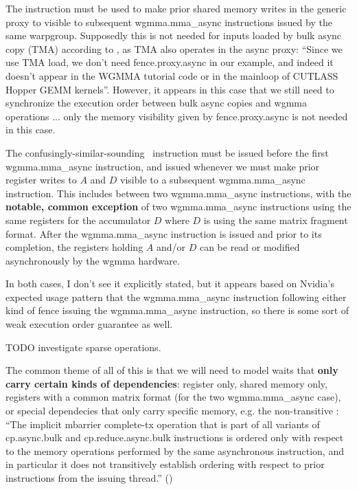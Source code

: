  The  instruction must be used to make prior shared memory writes in the generic proxy to visible to subsequent wgmma.mma\_async instructions issued by the same warpgroup.
Supposedly this is not needed for inputs loaded by bulk async copy (TMA) according to , as TMA also operates in the async proxy: ``Since we use TMA load, we don’t need fence.proxy.async in our example, and indeed it doesn’t appear in the WGMMA tutorial code or in the mainloop of CUTLASS Hopper GEMM kernels''.
However, it appears in this case that we still need to synchronize the execution order between bulk async copies and wgmma operations ... only the memory visibility given by fence.proxy.async is not needed in this case.

\filbreak
{} The confusingly-similar-sounding \wgmmaFence\ instruction must be issued before the first wgmma.mma\_async instruction, and issued whenever we must make prior register writes to $A$ and $D$ visible to a subsequent wgmma.mma\_async instruction.
This includes between two wgmma.mma\_async instructions, with the \textbf{notable, common exception} of two wgmma.mma\_async instructions using the same registers for the accumulator $D$ where $D$ is using the same matrix fragment format.
After the wgmma.mma\_async instruction is issued and prior to its completion, the registers holding $A$ and/or $D$ can be read or modified asynchronously by the wgmma hardware.

\filbreak
In both cases, I don't see it explicitly stated, but it appears based on Nvidia's expected usage pattern that the wgmma.mma\_async instruction following either kind of fence  issuing the wgmma.mma\_async instruction, so there is some sort of weak execution order guarantee as well.

TODO investigate sparse operations.

\filbreak
{}

The common theme of all of this is that we will need to model waits that \textbf{only carry certain kinds of dependencies}: register only, shared memory only, registers with a common matrix format (for the two wgmma.mma\_async case), or special dependecies that only carry specific memory, e.g. the non-transitive \completeTxOperation: ``The implicit mbarrier complete-tx operation that is part of all variants of cp.async.bulk and cp.reduce.async.bulk instructions is ordered only with respect to the memory operations performed by the same asynchronous instruction, and in particular it does not transitively establish ordering with respect to prior instructions from the issuing thread.'' ()

